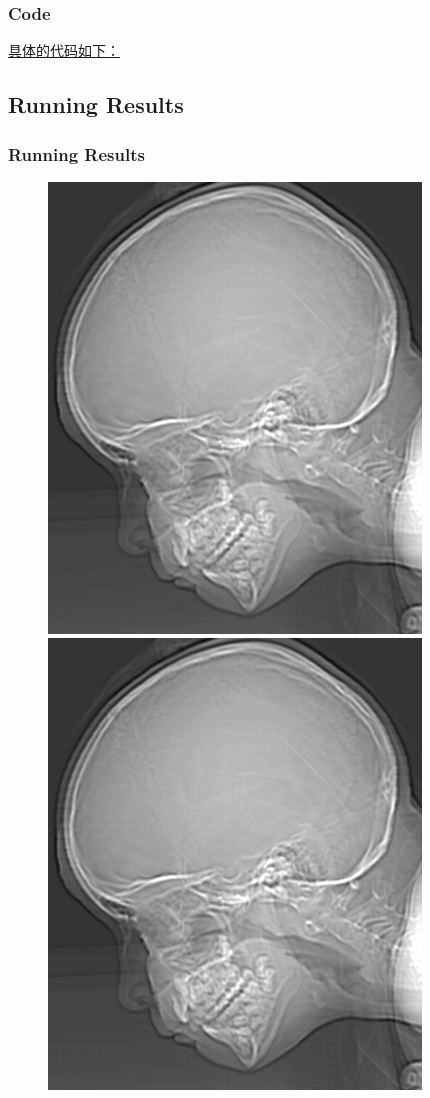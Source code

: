 \documentclass[notheorems,serif,table,compress]{beamer}  %
\begin{document}
\begin{frame}
\frametitle{Code}
\href{code/intensity.cpp}{\color{red}具体的代码如下：}
\end {frame}
\subsection{Running Results}
\begin{frame}
\frametitle{Running Results}
\begin{figure}
        \begin{minipage}[t]{0.4\linewidth}
        \centering
        \includegraphics[width=0.8\linewidth]{k=8.jpg} 
        \end{minipage}
        \begin{minipage}[t]{0.4\linewidth}
        \centering
        \includegraphics[width=0.8\linewidth]{k=7.jpg} 

\end{minipage}
\end{figure}
\end{frame}
\end{document}
